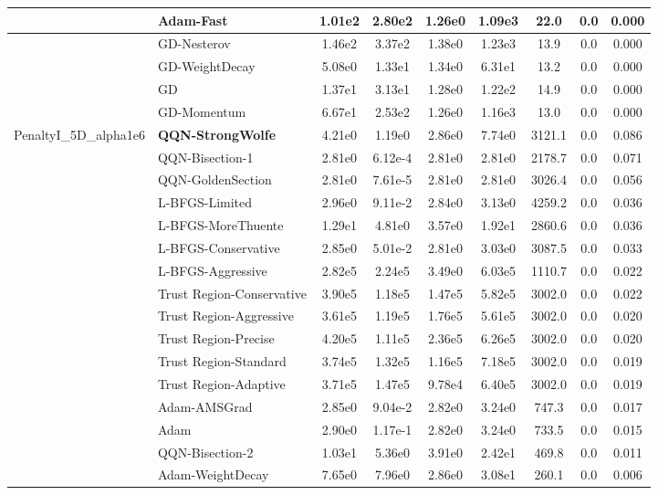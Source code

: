 \documentclass[10pt]{article}
\begin{document}
\begin{longtable}{|l|l|c|c|c|c|c|c|c|}
\hline
 & Adam-Fast & 1.01e2 & 2.80e2 & 1.26e0 & 1.09e3 & 22.0 & 0.0 & 0.000 \\
\hline
 & GD-Nesterov & 1.46e2 & 3.37e2 & 1.38e0 & 1.23e3 & 13.9 & 0.0 & 0.000 \\
\hline
 & GD-WeightDecay & 5.08e0 & 1.33e1 & 1.34e0 & 6.31e1 & 13.2 & 0.0 & 0.000 \\
\hline
 & GD & 1.37e1 & 3.13e1 & 1.28e0 & 1.22e2 & 14.9 & 0.0 & 0.000 \\
\hline
 & GD-Momentum & 6.67e1 & 2.53e2 & 1.26e0 & 1.16e3 & 13.0 & 0.0 & 0.000 \\
PenaltyI\_5D\_alpha1e6 & \textbf{QQN-StrongWolfe} & 4.21e0 & 1.19e0 & 2.86e0 & 7.74e0 & 3121.1 & 0.0 & 0.086 \\
\hline
 & QQN-Bisection-1 & 2.81e0 & 6.12e-4 & 2.81e0 & 2.81e0 & 2178.7 & 0.0 & 0.071 \\
\hline
 & QQN-GoldenSection & 2.81e0 & 7.61e-5 & 2.81e0 & 2.81e0 & 3026.4 & 0.0 & 0.056 \\
\hline
 & L-BFGS-Limited & 2.96e0 & 9.11e-2 & 2.84e0 & 3.13e0 & 4259.2 & 0.0 & 0.036 \\
\hline
 & L-BFGS-MoreThuente & 1.29e1 & 4.81e0 & 3.57e0 & 1.92e1 & 2860.6 & 0.0 & 0.036 \\
\hline
 & L-BFGS-Conservative & 2.85e0 & 5.01e-2 & 2.81e0 & 3.03e0 & 3087.5 & 0.0 & 0.033 \\
\hline
 & L-BFGS-Aggressive & 2.82e5 & 2.24e5 & 3.49e0 & 6.03e5 & 1110.7 & 0.0 & 0.022 \\
\hline
 & Trust Region-Conservative & 3.90e5 & 1.18e5 & 1.47e5 & 5.82e5 & 3002.0 & 0.0 & 0.022 \\
\hline
 & Trust Region-Aggressive & 3.61e5 & 1.19e5 & 1.76e5 & 5.61e5 & 3002.0 & 0.0 & 0.020 \\
\hline
 & Trust Region-Precise & 4.20e5 & 1.11e5 & 2.36e5 & 6.26e5 & 3002.0 & 0.0 & 0.020 \\
\hline
 & Trust Region-Standard & 3.74e5 & 1.32e5 & 1.16e5 & 7.18e5 & 3002.0 & 0.0 & 0.019 \\
\hline
 & Trust Region-Adaptive & 3.71e5 & 1.47e5 & 9.78e4 & 6.40e5 & 3002.0 & 0.0 & 0.019 \\
\hline
 & Adam-AMSGrad & 2.85e0 & 9.04e-2 & 2.82e0 & 3.24e0 & 747.3 & 0.0 & 0.017 \\
\hline
 & Adam & 2.90e0 & 1.17e-1 & 2.82e0 & 3.24e0 & 733.5 & 0.0 & 0.015 \\
\hline
 & QQN-Bisection-2 & 1.03e1 & 5.36e0 & 3.91e0 & 2.42e1 & 469.8 & 0.0 & 0.011 \\
\hline
 & Adam-WeightDecay & 7.65e0 & 7.96e0 & 2.86e0 & 3.08e1 & 260.1 & 0.0 & 0.006 \\

\end{longtable}
\end{document}
